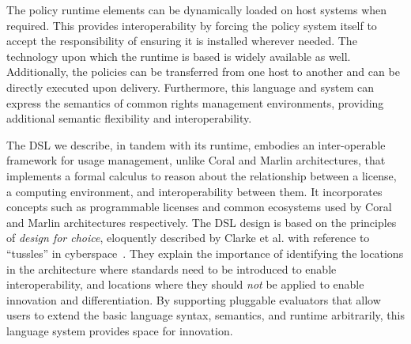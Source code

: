 The policy runtime elements can be dynamically loaded on host systems when required.  This provides interoperability by forcing the policy system itself to accept the responsibility of ensuring it is installed wherever needed.  The technology upon which the runtime is based is widely available as well.  Additionally, the policies can be transferred from one host to another and can be directly executed upon delivery.  Furthermore, this language and system can express the semantics of common rights management environments, providing additional semantic flexibility and interoperability.

The DSL we describe, in tandem with its runtime, embodies an inter-operable framework for usage management, unlike Coral and Marlin architectures, that implements a formal calculus to reason about the relationship between a license, a computing environment, and interoperability between them. It incorporates concepts such as programmable licenses and common ecosystems used by Coral and Marlin architectures respectively. The DSL design is based on the principles of {\em design for choice}, eloquently described by Clarke et al. with reference to ``tussles'' in cyberspace~\cite{ClWrSoBr:02}. They explain the importance of identifying the locations in the architecture where standards need to be introduced to enable interoperability, and locations where they should {\em not} be applied to enable innovation and differentiation.  By supporting pluggable evaluators that allow users to extend the basic language syntax, semantics, and runtime arbitrarily, this language system provides space for innovation.
